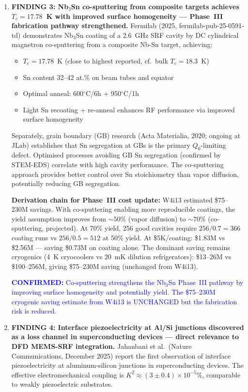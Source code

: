 \documentclass[11pt]{article}
\theoremstyle{definition}
\theoremstyle{remark}
\newcommand{\confirmed}[1]{\textcolor{blue}{\textbf{CONFIRMED:} #1}}
\begin{document}
\begin{tcolorbox}[colback=blue!5!white, colframe=blue!50!black,
  title=\textbf{W4i14 TOP 5 FINDINGS --- Ranked by Programme Impact}]
\begin{enumerate}
\item \textbf{FINDING 3: Nb$_3$Sn co-sputtering from composite
targets achieves $T_c = 17.78$~K with improved surface homogeneity
--- Phase~III fabrication pathway strengthened.}
Fermilab (2025, fermilab-pub-25-0591-td) demonstrates Nb$_3$Sn
coating of a 2.6~GHz SRF cavity by DC cylindrical magnetron
co-sputtering from a composite Nb-Sn target, achieving:
\begin{itemize}[nosep]
\item $T_c = 17.78$~K (close to highest reported, cf.\ bulk
  $T_c = 18.3$~K)
\item Sn content 32--42 at.\% on beam tubes and equator
\item Optimal anneal: 600$^\circ$C/6h + 950$^\circ$C/1h
\item Light Sn recoating + re-anneal enhances RF performance
  via improved surface homogeneity
\end{itemize}

Separately, grain boundary (GB) research (Acta Materialia, 2020;
ongoing at JLab) establishes that Sn segregation at GBs is the
primary $Q_0$-limiting defect. Optimised processes avoiding GB Sn
segregation (confirmed by STEM-EDS) correlate with high cavity
performance. The co-sputtering approach provides better control over
Sn stoichiometry than vapor diffusion, potentially reducing GB
segregation.

\textbf{Derivation chain for Phase~III cost update:}
W4i13 estimated \$75--230M savings. With co-sputtering enabling
more reproducible coatings, the yield assumption improves from
$\sim 50\%$ (vapor diffusion) to $\sim 70\%$ (co-sputtering,
projected). At 70\% yield, 256 good cavities require
$256/0.7 = 366$ coating runs vs $256/0.5 = 512$ at 50\% yield.
At \$5K/coating: \$1.83M vs \$2.56M --- saving \$0.73M on
coating alone. The dominant saving remains cryogenics
(4~K cryocoolers vs 20~mK dilution refrigerators): \$13--26M vs
\$100--256M, giving \$75--230M saving (unchanged from W4i13).

\confirmed{Co-sputtering strengthens the Nb$_3$Sn Phase~III pathway
by improving surface homogeneity and potentially yield. The \$75--230M
cryogenic saving estimate from W4i13 is UNCHANGED but the fabrication
risk is reduced.}

\item \textbf{FINDING 4: Interface piezoelectricity at Al/Si junctions
discovered as a loss channel in superconducting devices --- direct
relevance to DFD MEMS-SRF integration.}
Jahanbani et al.\ (Nature Communications, December 2025) report the
first observation of interface piezoelectricity at aluminum-silicon
junctions in superconducting devices. The effective electromechanical
coupling is $K^2 \approx (3 \pm 0.4) \times 10^{-5}\%$, comparable
to weakly piezoelectric substrates.


\end{enumerate}
\end{tcolorbox}
\end{document}
